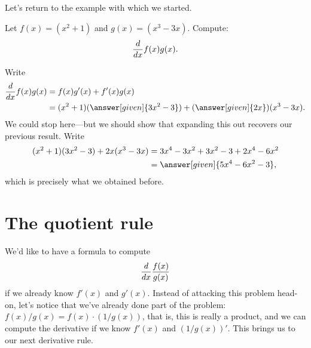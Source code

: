 \documentclass{ximera}
\begin{document}
Let's return to the example with which we started.
\begin{example} 
Let $f(x)=(x^2+1)$ and $g(x)=(x^3-3x)$. Compute:
\[
\frac{d}{dx} f(x)g(x).
\]

\begin{explanation}
Write
\begin{align*}
\ddx f(x)g(x) &= f(x)g'(x) + f'(x)g(x)\\
&=(x^2+1)(\answer[given]{3x^2-3}) + (\answer[given]{2x})(x^3-3x).
\end{align*}
We could stop here---but we should show that expanding this out recovers our previous result. Write
\begin{align*}
(x^2+1)(3x^2-3) + 2x(x^3-3x) &= 3x^4-3x^2 +3x^2 -3 + 2x^4-6x^2\\
&=\answer[given]{5x^4-6x^2-3},
\end{align*}
which is precisely what we obtained before.
\end{explanation}
\end{example}





\section{The quotient rule}


We'd like to have a formula to compute
\[
\frac{d}{dx} \frac{f(x)}{g(x)}
\]
if we already know $f'(x)$ and $g'(x)$. Instead of attacking this
problem head-on, let's notice that we've already done part of the
problem: $f(x)/g(x)= f(x)\cdot(1/g(x))$, that is, this is really a
product, and we can compute the derivative if we know $f'(x)$ and
$(1/g(x))'$. This brings us to our next derivative rule.
\end{document}
